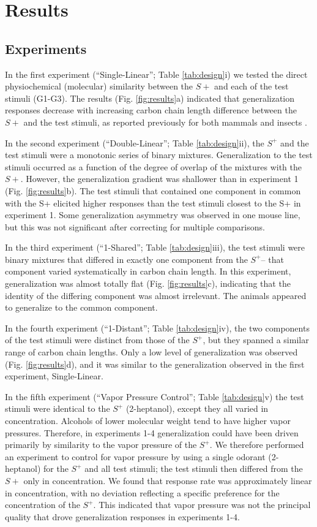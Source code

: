 \section*{Results}
\label{results}
\subsection*{Experiments}
\label{results_experiments}
In the first experiment (``Single-Linear''; Table \ref{tab:design}i) we tested the direct physiochemical (molecular) similarity between the $S+$ and each of the test stimuli (G1-G3). 
The results (Fig. \ref{fig:results}a) indicated that generalization responses decrease with increasing carbon chain length difference between the $S+$ and the test stimuli, as reported previously for both mammals and insects \cite{18810459}\cite{24488965}\cite{11551996}\cite{19129384}.  

In the second experiment (``Double-Linear''; Table \ref{tab:design}ii), the $S^+$ and the test stimuli were a monotonic series of binary mixtures.
Generalization to the test stimuli occurred as a function of the degree of overlap of the mixtures with the $S+$. 
However, the generalization gradient was shallower than in experiment 1 (Fig. \ref{fig:results}b). 
The test stimuli that contained one component in common with the S+ elicited higher responses than the test stimuli closest to the S+ in experiment 1. 
Some generalization asymmetry was observed in one mouse line, but this was not significant after correcting for multiple comparisons.   

In the third experiment (``1-Shared''; Table \ref{tab:design}iii), the test stimuli were binary mixtures that differed in exactly one component from the $S^+$-- that component varied systematically in carbon chain length.  
In this experiment, generalization was almost totally flat (Fig. \ref{fig:results}c), indicating that the identity of the differing component was almost irrelevant.  
The animals appeared to generalize to the common component.  

In the fourth experiment (``1-Distant''; Table \ref{tab:design}iv), the two components of the test stimuli were distinct from those of the $S^+$, but they spanned a similar range of carbon chain lengths. 
Only a low level of generalization was observed (Fig. \ref{fig:results}d), and it was similar to the generalization observed in the first experiment, Single-Linear.  

In the fifth experiment (``Vapor Pressure Control''; Table \ref{tab:design}v) the test stimuli were identical to the $S^+$ (2-heptanol), except they all varied in concentration.  
Alcohols of lower molecular weight tend to have higher vapor pressures.  
Therefore, in experiments 1-4 generalization could have been driven primarily by similarity to the vapor pressure of the $S^+$.  
We therefore performed an experiment to control for vapor pressure by using a single odorant (2-heptanol) for the $S^+$ and all test stimuli; the test stimuli then differed from the $S+$ only in concentration.  
We found that response rate was approximately linear in concentration, with no deviation reflecting a specific preference for the concentration of the $S^+$.  
This indicated that vapor pressure was not the principal quality that drove generalization responses in experiments 1-4.  